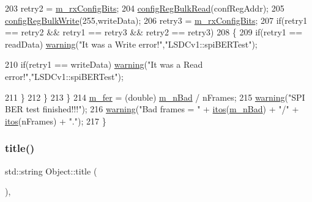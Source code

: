 \begin{DoxyCode}
203             retry2 = \hyperlink{classLSDelayChipV1_ae049797212539b231b9722ae69a0491d}{m\_rxConfigBits};
204             \hyperlink{classLSDelayChipV1_a97a50092ce40f6322db946fc580f7230}{configRegBulkRead}(confRegAddr);
205 \hyperlink{classLSDelayChipV1_afa626b5d52f8723bcaa3205d1cc7a0f8}{configRegBulkWrite}(255,writeData);            
206             retry3 = \hyperlink{classLSDelayChipV1_ae049797212539b231b9722ae69a0491d}{m\_rxConfigBits};          
207             \textcolor{keywordflow}{if}(retry1 == retry2 && retry1 == retry3 && retry2 == retry3)
208             \{
209                 \textcolor{keywordflow}{if}(retry1 == readData)  \hyperlink{classObject_a65cd4fda577711660821fd2cd5a3b4c9}{warning}(\textcolor{stringliteral}{"It was a Write error!"},\textcolor{stringliteral}{"LSDCv1::spiBERTest"});      
          
210                 \textcolor{keywordflow}{if}(retry1 == writeData) \hyperlink{classObject_a65cd4fda577711660821fd2cd5a3b4c9}{warning}(\textcolor{stringliteral}{"It was a Read error!"},\textcolor{stringliteral}{"LSDCv1::spiBERTest"});       
         
211             \} 
212         \}
213     \}
214     \hyperlink{classLSDelayChipV1_a38d35de6a25fb1394ede2f39a4f25a08}{m\_fer} = (double) \hyperlink{classLSDelayChipV1_a425c69ef8f3d64d93cb1c86b83bbceec}{m\_nBad} / nFrames;
215     \hyperlink{classObject_a65cd4fda577711660821fd2cd5a3b4c9}{warning}(\textcolor{stringliteral}{"SPI BER test finished!!!"});
216     \hyperlink{classObject_a65cd4fda577711660821fd2cd5a3b4c9}{warning}(\textcolor{stringliteral}{"Bad frames = "} + \hyperlink{Tools_8h_af330027dbdafb9a30768b3613c553e60}{itos}(\hyperlink{classLSDelayChipV1_a425c69ef8f3d64d93cb1c86b83bbceec}{m\_nBad}) + \textcolor{stringliteral}{"/"} + \hyperlink{Tools_8h_af330027dbdafb9a30768b3613c553e60}{itos}(nFrames) + \textcolor{stringliteral}{"."});
217 \}
\end{DoxyCode}
\mbox{\label{classObject_a73a0f1a41828fdd8303dd662446fb6c3}} 
\subsubsection{\texorpdfstring{title()}{title()}}
{\footnotesize\ttfamily std\+::string Object\+::title (\begin{DoxyParamCaption}{ }\end{DoxyParamCaption})\hspace{0.3cm}{\ttfamily [inline]}, {\ttfamily [inherited]}}



